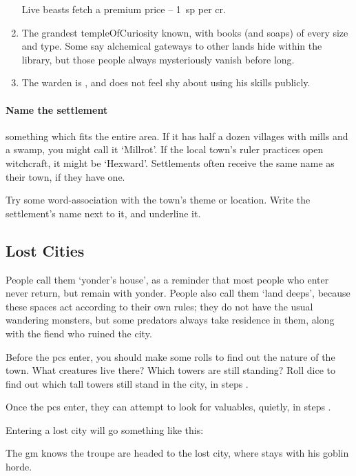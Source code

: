 \begin{multicols}{2}
\begin{enumerate}
  Live beasts fetch a premium price -- 1~\gls{sp} per \gls{cr}.
  \item
  The grandest \gls{templeOfCuriosity} known, with books (and soaps) of every size and type.
  Some say alchemical gateways to other lands hide within the library, but those people always mysteriously vanish before long.
  \item
  The \gls{warden} is , and does not feel shy about using his skills publicly.
\end{enumerate}

\paragraph{Name the settlement}
something which fits the entire area.
If it has half a dozen \glspl{village} with mills and a swamp, you might call it `Millrot'.
If the local town's ruler practices open \gls{witchcraft}, it might be `Hexward'.
Settlements often receive the same name as their town, if they have one.

Try some word-association with the town's theme or location.
Write the settlement's name next to it, and underline it.

\subsection{Lost Cities}
\label{lostCities}


People call them `\gls{yonder}'s house', as a reminder that most people who enter never return, but remain with \gls{yonder}.
People also call them `land \glspl{deep}', because these spaces act according to their own rules; they do not have the usual wandering monsters, but some predators always take residence in them, along with the fiend who ruined the city.

Before the \glspl{pc} enter, you should make some rolls to find out the nature of the town.
What creatures live there?
Which towers are still standing?
Roll dice to find out which tall towers still stand in the city, in steps .

Once the \glspl{pc} enter, they can attempt to look for valuables, quietly, in steps .

Entering a lost city will go something like this:

\begin{exampletext}
  The \gls{gm} knows the troupe are headed to the lost city, where  stays with his goblin horde.


\end{exampletext}
\end{multicols}
